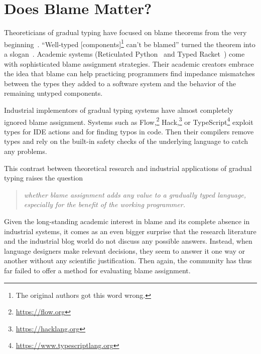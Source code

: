 \section{Does Blame Matter?}
\label{sec:introduction}

Theoreticians of gradual typing have focused on blame theorems from the very
beginning~\cite{mf-toplas-2009, tf-dls-2006}. ``Well-typed
[components]\footnote{The original authors got this word wrong.} can't be
blamed'' turned the theorem into a slogan~\cite{wf-esop-2009}. Academic systems
(Reticulated Python~\cite{vsc-dls-2019, vss-popl-2017, vksb-dls-2014} and Typed
Racket~\cite{tf-dls-2006,tf-popl-2008,tfffgksst-snapl-2017,tf-icfp-2010}) come
with sophisticated blame assignment strategies. Their academic creators embrace
the idea that blame can help practicing programmers find impedance mismatches
between the types they added to a software system and the behavior of the
remaining untyped components.

Industrial implementors of gradual typing systems have almost completely ignored
blame assignment.  Systems such as Flow,\footnote{\url{https://flow.org}}
Hack,\footnote{\url{https://hacklang.org}} or
TypeScript\footnote{\url{https://www.typescriptlang.org}} exploit types for IDE
actions and for finding typos in code. Then their compilers remove types and
rely on the built-in safety checks of the underlying language to catch any
problems.

This contrast between theoretical research and industrial applications of gradual typing raises the question 
\begin{quote}
 \it
 whether blame assignment adds any value to a gradually typed language,
 especially for the benefit of the working programmer.
\end{quote}
Given the long-standing academic interest in blame and its complete absence in
industrial systems, it comes as an even bigger surprise that the research
literature and the industrial blog world do not discuss any possible answers.
Instead, when language designers make relevant decisions, they seem to answer it
one way or another without any scientific justification. Then again, the
community has thus far failed to offer a method for evaluating blame assignment.

